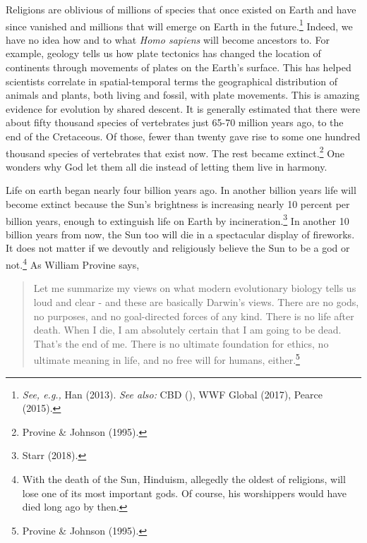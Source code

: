 \begin{multicols}{2}
Religions are oblivious of millions of species that once existed on Earth and have since vanished and
millions that will emerge on Earth in the future.\footnote{\textit{See, e.g.,} Han (2013). \textit{See also:} CBD (), WWF Global (2017), Pearce (2015).} Indeed, we have no idea how and to what \textit{Homo
sapiens} will become ancestors to. For example, geology tells us how plate tectonics has changed the
location of continents through movements of plates on the Earth's surface. This has helped scientists
correlate in spatial-temporal terms the geographical distribution of animals and plants, both living and
fossil, with plate movements. This is amazing evidence for evolution by shared descent. It is generally
estimated that there were about fifty thousand species of vertebrates just 65-70 million years ago, to
the end of the Cretaceous. Of those, fewer than twenty gave rise to some one hundred thousand
species of vertebrates that exist now. The rest became extinct.\footnote{Provine \& Johnson (1995).}  One wonders why God let them all die instead of letting them live in harmony.

Life on earth began nearly four billion years ago. In another billion years life will become extinct
because the Sun's brightness is increasing nearly 10 percent per billion years, enough to extinguish
life on Earth by incineration.\footnote{Starr (2018).} In another 10 billion years from now, the Sun too will die in a spectacular display of fireworks. It does not matter if we devoutly and religiously believe the Sun to be a god or not.\footnote{With the death of the Sun, Hinduism, allegedly the oldest of religions, will lose one of its most important gods. Of course, his worshippers would have died long ago by then.} As William Provine says,

\begin{quote}
Let me summarize my views on what modern evolutionary biology tells us loud and clear - and these
are basically Darwin's views. There are no gods, no purposes, and no goal-directed forces of any kind.
There is no life after death. When I die, I am absolutely certain that I am going to be dead. That's the
end of me. There is no ultimate foundation for ethics, no ultimate meaning in life, and no free will
for humans, either.\footnote{Provine \& Johnson (1995).}
\end{quote}


\end{multicols}
